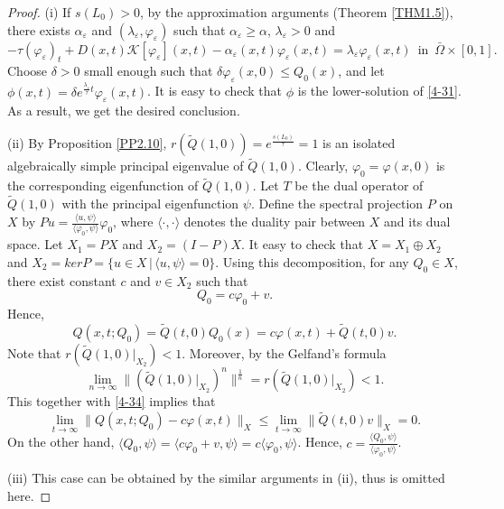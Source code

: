 \documentclass[11pt,reqno]{amsart}
\numberwithin{equation}{section}
\begin{document}
\begin{proof}
(i)
If $s(L_{0}) >0$, by the approximation arguments (Theorem \ref{THM1.5}), there exists $\alpha_{\varepsilon}$ and $(\lambda_{\varepsilon},\varphi_{\varepsilon})$ such that $\alpha_{\varepsilon} \geq \alpha$, $\lambda_{\varepsilon}>0$ and
\begin{equation*}
-\tau (\varphi_{\varepsilon})_{t} + D(x,t)\mathcal{K}[\varphi_{\varepsilon}](x,t) - \alpha_{\varepsilon}(x,t)\varphi_{\varepsilon}(x,t) = \lambda_{\varepsilon}\varphi_{\varepsilon}(x,t)
\enspace \text{in} \enspace
\bar{\Omega} \times [0,1].
\end{equation*}
Choose $\delta>0$ small enough such that
$\delta\varphi_{\varepsilon}(x,0) \leq Q_{0}(x)$, and let $\phi(x,t) = \delta e^{\frac{\lambda_{\varepsilon}}{\tau}t}\varphi_{\varepsilon}(x,t) $.
It is easy to check that $\phi$ is the lower-solution of \eqref{4-31}. As a result, we get the desired conclusion.

(ii) By Proposition \ref{PP2.10}, $r(\tilde{Q}(1,0))=e^{ \frac{s(L_{0})}{\tau}}=1$ is an isolated algebraically simple principal eigenvalue of $\tilde{Q}(1,0)$. Clearly, $\varphi_{0} = \varphi(x,0)$ is the corresponding eigenfunction of $\tilde{Q}(1,0)$.
Let $T$ be the dual operator of $\tilde{Q}(1,0)$ with the principal eigenfunction $\psi$.
Define the spectral projection $P$ on $X$ by
$Pu = \frac{\langle u , \psi \rangle}{\langle \varphi_{0}, \psi \rangle} \varphi_{0}$, where $\langle \cdot , \cdot \rangle$ denotes the duality pair between $X$ and its dual space.
Let $X_{1} = PX$ and $X_{2} = (I - P)X$. It easy to check that
$X = X_{1} \oplus X_{2}$
and $X_{2} = ker P = \{u\in X \,|\, \langle u , \psi \rangle =0 \}$. Using this decomposition, for any $Q_{0} \in X$, there exist
constant $c$ and $v \in X_{2}$ such that
\begin{equation*}
Q_{0} = c\varphi_{0} + v.
\end{equation*}
Hence,
\begin{equation}\label{4-34}
Q(x,t;Q_{0}) = \tilde{Q}(t,0)Q_{0}(x) = c\varphi(x,t) + \tilde{Q}(t,0)v.
\end{equation}
Note that $r(\tilde{Q}(1,0) |_{X_{2}} ) < 1$.
Moreover, by the Gelfand's formula
\begin{equation*}
\lim\limits_{n\to\infty} \| (\tilde{Q}(1,0)|_{X_{2}} )^{n}\|^{\frac{1}{n}} = r(\tilde{Q}(1,0)|_{X_{2}}) < 1.
\end{equation*}
This together with \eqref{4-34} implies that
\begin{equation*}
\lim\limits_{t \to \infty} \| Q(x,t;Q_{0}) - c\varphi(x,t)  \|_{X}
\leq
\lim\limits_{t \to \infty} \|\tilde{Q}(t,0)v \|_{X}
=0.
\end{equation*}
On the other hand, $\langle Q_{0} , \psi \rangle = \langle c\varphi_{0} + v , \psi \rangle = c\langle \varphi_{0} , \psi \rangle$. Hence, $c = \frac{\langle Q_{0} , \psi \rangle  }{ \langle \varphi_{0} , \psi \rangle }$.


(iii) This case can be obtained by the similar arguments in (ii),  thus is omitted here.
\end{proof}
\end{document}
